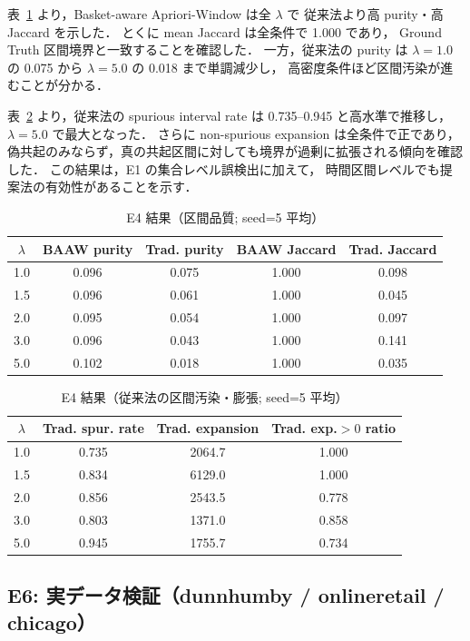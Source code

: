 表~\ref{tab:e4_interval_quality} より，Basket-aware Apriori-Window は全 $\lambda$ で
従来法より高 purity・高 Jaccard を示した．
とくに mean Jaccard は全条件で 1.000 であり，
Ground Truth 区間境界と一致することを確認した．
一方，従来法の purity は $\lambda=1.0$ の 0.075 から
$\lambda=5.0$ の 0.018 まで単調減少し，
高密度条件ほど区間汚染が進むことが分かる．

表~\ref{tab:e4_interval_artifacts} より，従来法の spurious interval rate は
0.735--0.945 と高水準で推移し，
$\lambda=5.0$ で最大となった．
さらに non-spurious expansion は全条件で正であり，
偽共起のみならず，真の共起区間に対しても境界が過剰に拡張される傾向を確認した．
この結果は，E1 の集合レベル誤検出に加えて，
時間区間レベルでも提案法の有効性があることを示す．

\begin{table}[t]
\caption{E4 結果（区間品質; seed=5 平均）}
\label{tab:e4_interval_quality}
\centering
\scriptsize
\begin{tabular}{ccccc}
\toprule
$\lambda$ & BAAW purity & Trad. purity & BAAW Jaccard & Trad. Jaccard \\
\midrule
1.0 & 0.096 & 0.075 & 1.000 & 0.098 \\
1.5 & 0.096 & 0.061 & 1.000 & 0.045 \\
2.0 & 0.095 & 0.054 & 1.000 & 0.097 \\
3.0 & 0.096 & 0.043 & 1.000 & 0.141 \\
5.0 & 0.102 & 0.018 & 1.000 & 0.035 \\
\bottomrule
\end{tabular}
\end{table}

\begin{table}[t]
\caption{E4 結果（従来法の区間汚染・膨張; seed=5 平均）}
\label{tab:e4_interval_artifacts}
\centering
\scriptsize
\begin{tabular}{cccc}
\toprule
$\lambda$ & Trad. spur. rate & Trad. expansion & Trad. exp.$>0$ ratio \\
\midrule
1.0 & 0.735 & 2064.7 & 1.000 \\
1.5 & 0.834 & 6129.0 & 1.000 \\
2.0 & 0.856 & 2543.5 & 0.778 \\
3.0 & 0.803 & 1371.0 & 0.858 \\
5.0 & 0.945 & 1755.7 & 0.734 \\
\bottomrule
\end{tabular}
\end{table}

\subsection{E6: 実データ検証（dunnhumby / onlineretail / chicago）}
\label{sec:exp_e6}


